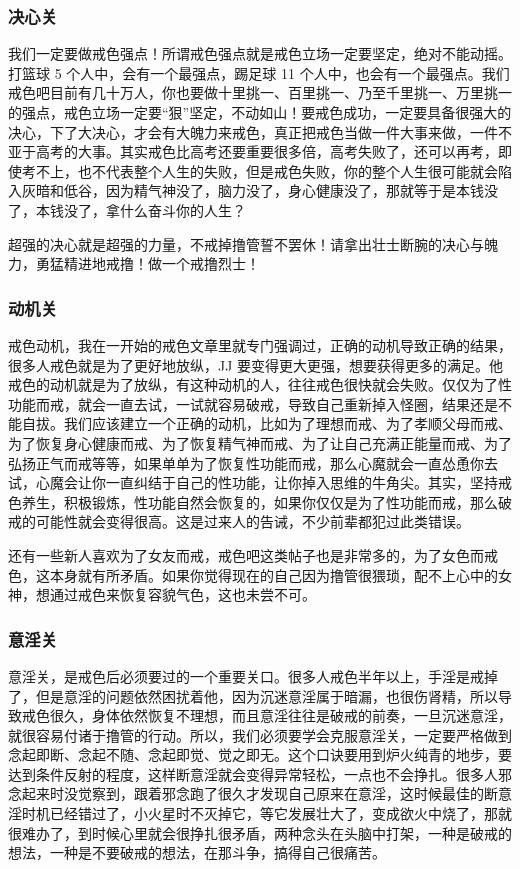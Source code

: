 \documentclass{ctexart}
\begin{document}
\subsubsection{决心关}

我们一定要做戒色强点！所谓戒色强点就是戒色立场一定要坚定，绝对不能动摇。打篮球 5 个人中，会有一个最强点，踢足球 11 个人中，也会有一个最强点。我们戒色吧目前有几十万人，你也要做十里挑一、百里挑一、乃至千里挑一、万里挑一的强点，戒色立场一定要“狠”坚定，不动如山！要戒色成功，一定要具备很强大的决心，下了大决心，才会有大魄力来戒色，真正把戒色当做一件大事来做，一件不亚于高考的大事。其实戒色比高考还要重要很多倍，高考失败了，还可以再考，即使考不上，也不代表整个人生的失败，但是戒色失败，你的整个人生很可能就会陷入灰暗和低谷，因为精气神没了，脑力没了，身心健康没了，那就等于是本钱没了，本钱没了，拿什么奋斗你的人生？

超强的决心就是超强的力量，不戒掉撸管誓不罢休！请拿出壮士断腕的决心与魄力，勇猛精进地戒撸！做一个戒撸烈士！

\subsubsection{动机关}

戒色动机，我在一开始的戒色文章里就专门强调过，正确的动机导致正确的结果，很多人戒色就是为了更好地放纵，JJ 要变得更大更强，想要获得更多的满足。他戒色的动机就是为了放纵，有这种动机的人，往往戒色很快就会失败。仅仅为了性功能而戒，就会一直去试，一试就容易破戒，导致自己重新掉入怪圈，结果还是不能自拔。我们应该建立一个正确的动机，比如为了理想而戒、为了孝顺父母而戒、为了恢复身心健康而戒、为了恢复精气神而戒、为了让自己充满正能量而戒、为了弘扬正气而戒等等，如果单单为了恢复性功能而戒，那么心魔就会一直怂恿你去试，心魔会让你一直纠结于自己的性功能，让你掉入思维的牛角尖。其实，坚持戒色养生，积极锻炼，性功能自然会恢复的，如果你仅仅是为了性功能而戒，那么破戒的可能性就会变得很高。这是过来人的告诫，不少前辈都犯过此类错误。

还有一些新人喜欢为了女友而戒，戒色吧这类帖子也是非常多的，为了女色而戒色，这本身就有所矛盾。如果你觉得现在的自己因为撸管很猥琐，配不上心中的女神，想通过戒色来恢复容貌气色，这也未尝不可。

\subsubsection{意淫关}

意淫关，是戒色后必须要过的一个重要关口。很多人戒色半年以上，手淫是戒掉了，但是意淫的问题依然困扰着他，因为沉迷意淫属于暗漏，也很伤肾精，所以导致戒色很久，身体依然恢复不理想，而且意淫往往是破戒的前奏，一旦沉迷意淫，就很容易付诸于撸管的行动。所以，我们必须要学会克服意淫关，一定要严格做到念起即断、念起不随、念起即觉、觉之即无。这个口诀要用到炉火纯青的地步，要达到条件反射的程度，这样断意淫就会变得异常轻松，一点也不会挣扎。很多人邪念起来时没觉察到，跟着邪念跑了很久才发现自己原来在意淫，这时候最佳的断意淫时机已经错过了，小火星时不灭掉它，等它发展壮大了，变成欲火中烧了，那就很难办了，到时候心里就会很挣扎很矛盾，两种念头在头脑中打架，一种是破戒的想法，一种是不要破戒的想法，在那斗争，搞得自己很痛苦。
\end{document}
